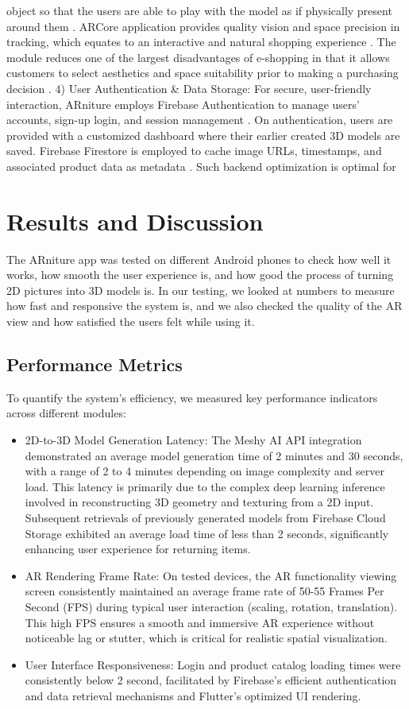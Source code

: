 \documentclass[12pt, a4paper]{article}
\begin{document}
object so that the users are able to play with the model as if physically present around them \cite{ref7}. ARCore application provides quality vision and space precision in tracking, which equates to an interactive and natural shopping experience \cite{ref16}. The module reduces one of the largest disadvantages of e-shopping in that it allows customers to select aesthetics and space suitability prior to making a purchasing decision \cite{ref11,ref13}. 4) User Authentication \& Data Storage: For secure, user-friendly interaction, ARniture employs Firebase Authentication to manage users' accounts, sign-up login, and session management \cite{ref4,ref18}. On authentication, users are provided with a customized dashboard where their earlier created 3D models are saved. Firebase Firestore is employed to cache image URLs, timestamps, and associated product data as metadata \cite{ref19}. Such backend optimization is optimal for

\section{Results and Discussion}
The ARniture app was tested on different Android phones to check how well it works, how smooth the user experience is, and how good the process of turning 2D pictures into 3D models is. In our testing, we looked at numbers to measure how fast and responsive the system is, and we also checked the quality of the AR view and how satisfied the users felt while using it.

\subsection{Performance Metrics}
To quantify the system's efficiency, we measured key performance indicators across different modules:
\begin{itemize}
\item 2D-to-3D Model Generation Latency: The Meshy AI API integration demonstrated an average model generation time of 2 minutes and 30 seconds, with a range of 2 to 4 minutes depending on image complexity and server load. This latency is primarily due to the complex deep learning inference involved in reconstructing 3D geometry and texturing from a 2D input. Subsequent retrievals of previously generated models from Firebase Cloud Storage exhibited an average load time of less than 2 seconds, significantly enhancing user experience for returning items.
\item AR Rendering Frame Rate: On tested devices, the AR functionality viewing screen consistently maintained an average frame rate of 50-55 Frames Per Second (FPS) during typical user interaction (scaling, rotation, translation). This high FPS ensures a smooth and immersive AR experience without noticeable lag or stutter, which is critical for realistic spatial visualization.
\item User Interface Responsiveness: Login and product catalog loading times were consistently below 2 second, facilitated by Firebase's efficient authentication and data retrieval mechanisms and Flutter's optimized UI rendering.
\end{itemize}
\end{document}
